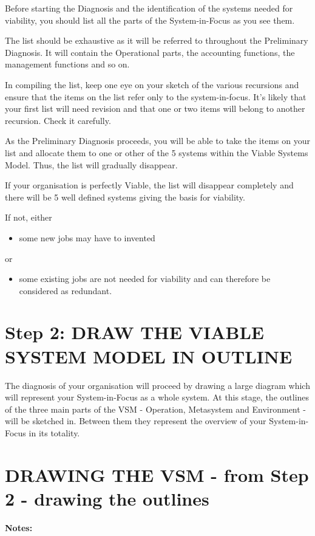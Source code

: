 Before starting the Diagnosis and the identification of the systems needed for viability, you should list all the parts of the System-in-Focus as you see them.

The list should be exhaustive as it will be referred to throughout the Preliminary Diagnosis. It will contain the Operational parts, the accounting functions, the management functions and so on.

In compiling the list, keep one eye on your sketch of the various recursions and ensure that the items on the list refer only to the system-in-focus. It's likely that your first list will need revision and that one or two items will belong to another recursion. Check it carefully.

As the Preliminary Diagnosis proceeds, you will be able to take the items on your list and allocate them to one or other of the 5 systems within the Viable Systems Model. Thus, the list will gradually disappear.

If your organisation is perfectly Viable, the list will disappear completely and there will be 5 well defined systems giving the basis for viability.

If not, either

\begin{itemize}
  \item some new jobs may have to invented
\end{itemize}

or

\begin{itemize}
  \item some existing jobs are not needed for viability and can therefore be considered as redundant.
\end{itemize}

\section*{Step 2: DRAW THE VIABLE SYSTEM MODEL IN OUTLINE}
The diagnosis of your organisation will proceed by drawing a large diagram which will represent your System-in-Focus as a whole system. At this stage, the outlines of the three main parts of the VSM - Operation, Metasystem and Environment - will be sketched in. Between them they represent the overview of your System-in-Focus in its totality.


\section*{DRAWING THE VSM - from Step 2 - drawing the outlines}
\textbf{Notes:}

